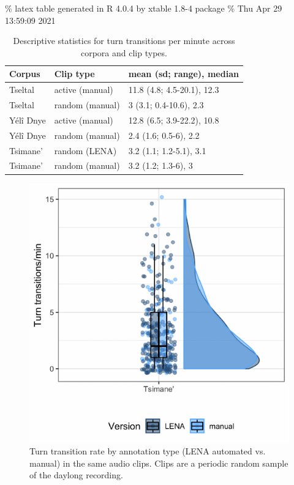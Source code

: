 \documentclass[10pt, letterpaper]{article}
\newenvironment{CodeChunk}{}{}
\begin{document}
\% latex table generated in R 4.0.4 by xtable 1.8-4 package \% Thu Apr
29 13:59:09 2021

\begin{table}[h]
\centering
\begin{tabular}{lll}
  \hline
Corpus & Clip type & mean (sd; range), median \\ 
  \hline
Tseltal & active (manual) & 11.8 (4.8; 4.5-20.1), 12.3 \\ 
  Tseltal & random (manual) & 3 (3.1; 0.4-10.6), 2.3 \\ 
  Yélî Dnye & active (manual) & 12.8 (6.5; 3.9-22.2), 10.8 \\ 
  Yélî Dnye & random (manual) & 2.4 (1.6; 0.5-6), 2.2 \\ 
  Tsimane' & random (LENA) & 3.2 (1.1; 1.2-5.1), 3.1 \\ 
  Tsimane' & random (manual) & 3.2 (1.2; 1.3-6), 3 \\ 
   \hline
\end{tabular}
\caption{Descriptive statistics for turn transitions per minute across corpora and clip types.} 
\end{table}

\begin{CodeChunk}
\begin{figure}[h]

{\centering \includegraphics{figs/tsi.ttr.fig-1} 

}

\caption[Turn transition rate by annotation type (LENA automated vs]{Turn transition rate by annotation type (LENA automated vs. manual) in the same audio clips. Clips are a periodic random sample of the daylong recording.}\label{fig:tsi.ttr.fig}
\end{figure}
\end{CodeChunk}
\end{document}
